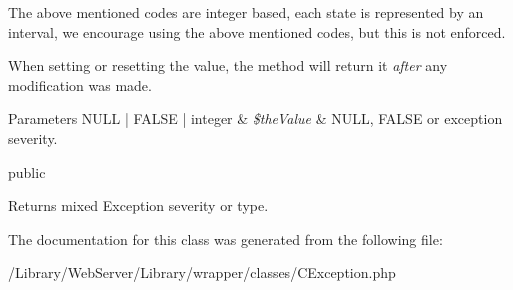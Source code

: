 The above mentioned codes are integer based, each state is represented by an interval, we encourage using the above mentioned codes, but this is not enforced.

When setting or resetting the value, the method will return it {\itshape after} any modification was made.


\begin{DoxyParams}[1]{Parameters}
N\-U\-L\-L | F\-A\-L\-S\-E | integer & {\em \$the\-Value} & N\-U\-L\-L, F\-A\-L\-S\-E or exception severity.\\
\hline
\end{DoxyParams}
public \begin{DoxyReturn}{Returns}
mixed Exception severity or type. 
\end{DoxyReturn}


The documentation for this class was generated from the following file\-:\begin{DoxyCompactItemize}
\item 
/\-Library/\-Web\-Server/\-Library/wrapper/classes/C\-Exception.\-php\end{DoxyCompactItemize}

